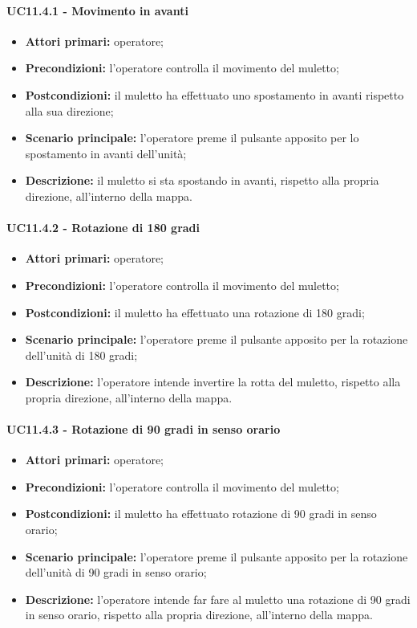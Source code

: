 \paragraph{UC11.4.1 - Movimento in avanti}
\begin{itemize}
	\item 	\textbf{Attori primari:} operatore;
	\item 	\textbf{Precondizioni:} l'operatore controlla il movimento del muletto;
	\item 	\textbf{Postcondizioni:} il muletto ha effettuato uno spostamento in avanti rispetto alla sua direzione; 
	\item 	\textbf{Scenario principale:} l'operatore preme il pulsante apposito per lo spostamento in avanti dell'unità;
	\item 	\textbf{Descrizione:} il muletto si sta spostando in avanti, rispetto alla propria direzione, all'interno della mappa.

\end{itemize}

\paragraph{UC11.4.2 - Rotazione di 180 gradi}
\begin{itemize}
	\item 	\textbf{Attori primari:} operatore;
	\item 	\textbf{Precondizioni:} l'operatore controlla il movimento del muletto;
	\item 	\textbf{Postcondizioni:} il muletto ha effettuato una rotazione di 180 gradi; 
	\item 	\textbf{Scenario principale:} l'operatore preme il pulsante apposito per la rotazione dell'unità di 180 gradi;
	\item 	\textbf{Descrizione:} l'operatore intende invertire la rotta del muletto, rispetto alla propria direzione, all'interno della mappa.
\end{itemize}

\paragraph{UC11.4.3 - Rotazione di 90 gradi in senso orario}
\begin{itemize}
	\item 	\textbf{Attori primari:} operatore;
	\item 	\textbf{Precondizioni:} l'operatore controlla il movimento del muletto;
	\item 	\textbf{Postcondizioni:} il muletto ha effettuato rotazione di 90 gradi in senso orario; 
	\item 	\textbf{Scenario principale:} l'operatore preme il pulsante apposito per la rotazione dell'unità di 90 gradi in senso orario;
	\item 	\textbf{Descrizione:} l'operatore intende far fare al muletto una rotazione di 90 gradi in senso orario, rispetto alla propria direzione, all'interno della mappa.
\end{itemize}

